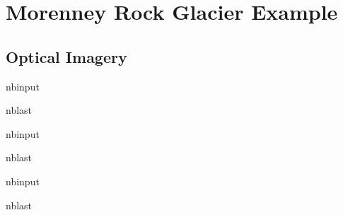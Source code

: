 \documentclass[letterpaper,10pt,english]{sphinxmanual}
\begin{document}
\section{Morenney Rock Glacier Example}
\label{\detokenize{notebooks/Meager_radar:Morenney-Rock-Glacier-Example}}\label{\detokenize{notebooks/Meager_radar::doc}}

\subsection{Optical Imagery}
\label{\detokenize{notebooks/Meager_radar:Optical-Imagery}}
\begin{sphinxuseclass}{nbinput}
\begin{sphinxuseclass}{nblast}
{
\begin{sphinxVerbatim}[commandchars=\\\{\}]
\llap{\color{nbsphinxin}[ ]:\,\hspace{\fboxrule}\hspace{\fboxsep}}
\end{sphinxVerbatim}
}

\end{sphinxuseclass}
\end{sphinxuseclass}
\begin{sphinxuseclass}{nbinput}
\begin{sphinxuseclass}{nblast}
{
\begin{sphinxVerbatim}[commandchars=\\\{\}]
\llap{\color{nbsphinxin}[ ]:\,\hspace{\fboxrule}\hspace{\fboxsep}}
\end{sphinxVerbatim}
}

\end{sphinxuseclass}
\end{sphinxuseclass}
\begin{sphinxuseclass}{nbinput}
\begin{sphinxuseclass}{nblast}
{
\begin{sphinxVerbatim}[commandchars=\\\{\}]
\llap{\color{nbsphinxin}[ ]:\,\hspace{\fboxrule}\hspace{\fboxsep}}
\end{sphinxVerbatim}
}

\end{sphinxuseclass}
\end{sphinxuseclass}
\end{document}
